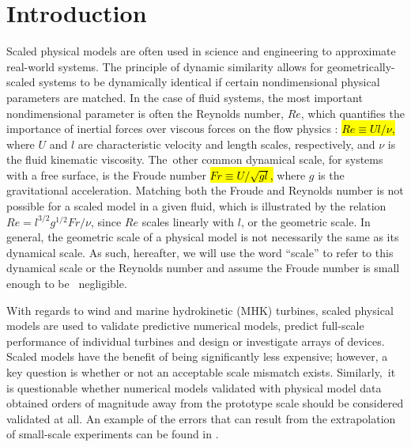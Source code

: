 \documentclass[energies,article,accept,moreauthors,pdftex,10pt,a4paper]{mdpi}
\theoremstyle{mdpi}
\newcounter{ex}
\newcounter{re}
\begin{document}
\section{Introduction}

Scaled physical models are often used in science and engineering to approximate
real-world systems. The principle of dynamic similarity allows for geometrically-scaled systems to be dynamically identical if certain nondimensional physical
parameters are matched. In the case of fluid systems, the most important
nondimensional parameter is often the Reynolds number, $Re$, which quantifies
the importance of inertial forces over viscous forces on the flow physics
\cite{Acheson1990}: \hl {$Re \equiv Ul/\nu$, } 
where $U$ and $l$ are characteristic
velocity and length scales, respectively, and $\nu$ is the fluid kinematic
viscosity. The~other common dynamical scale, for systems with a free
surface, is the Froude number \hl {$Fr \equiv U/\sqrt{gl}$,}
  where $g$ is the
gravitational acceleration. Matching both the Froude and Reynolds number is not
possible for a scaled model in a given fluid, which is illustrated by the
relation $Re = l^{3/2} g^{1/2} Fr / \nu$, since $Re$ scales linearly with $l$,
or the geometric scale. In general, the geometric scale of a physical model is
not necessarily the same as its dynamical scale. As such, hereafter, we will use
the word ``scale'' to refer to this dynamical scale or the Reynolds number and
assume the Froude number is small enough to be~ negligible.

With regards to wind and marine hydrokinetic (MHK) turbines, scaled physical
models are used to validate predictive numerical models, predict full-scale
performance of individual turbines and design or investigate arrays of devices.
Scaled models have the benefit of being significantly less expensive; however, a
key question is whether or not an acceptable scale mismatch exists. Similarly,~it is questionable whether numerical models validated with physical model data
obtained orders of magnitude away from the prototype scale should be considered
validated at all. An example of the errors that can result from the
extrapolation of small-scale experiments can be found in \cite{Baker1991}.
\end{document}

